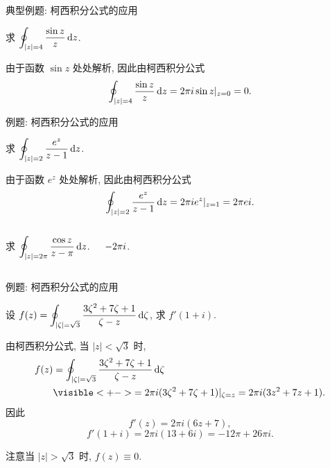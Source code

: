 \begin{frame}{典型例题: 柯西积分公式的应用}
\begin{example}
求 $\displaystyle\oint_{|z|=4}\frac{\sin z}z\,\mathrm{d} z$.
\end{example}
\begin{solution}
由于函数 $\sin z$ 处处解析,
\onslide<+->
因此由柯西积分公式
\[\oint_{|z|=4}\frac{\sin z}z\,\mathrm{d} z
=2\pi i \sin z|_{z=0}=0.\]
\end{solution}
\end{frame}


\begin{frame}[<*>]{例题: 柯西积分公式的应用}
\onslide<+->
\begin{example}
求 $\displaystyle\oint_{|z|=2}\frac{e^z}{z-1}\,\mathrm{d} z$.
\end{example}

\onslide<+->
\begin{solution}
由于函数 $e^z$ 处处解析,
\onslide<+->
因此由柯西积分公式
\[\oint_{|z|=2}\frac{e^z}{z-1}\,\mathrm{d} z
=2\pi i e^z|_{z=1}=2\pi ei.\]
\end{solution}

\onslide<+->
\begin{columns}
		\begin{exercise}
		求 $\displaystyle\oint_{|z|=2\pi}\frac{\cos z}{z-\pi}\,\mathrm{d} z$.
		\end{exercise}\onslide<+->
		\begin{answer}
		$-2\pi i\vphantom{\displaystyle\oint_{|z|=2\pi}\frac{\cos z}{z-\pi}\diff z}$.
		\end{answer}
\end{columns}
\end{frame}


\begin{frame}{例题: 柯西积分公式的应用}
\beqskip{5pt}
\begin{example}
设 $f(z)=\displaystyle\oint_{|\zeta|=\sqrt3}\frac{3\zeta^2+7\zeta+1}{\zeta-z}\,\mathrm{d} \zeta$, 求 $f'(1+i)$.
\end{example}
\begin{solution}
由柯西积分公式, 当 $|z|<\sqrt3$ 时,
\begin{align*}
f(z)&=\oint_{|\zeta|=\sqrt3}\frac{3\zeta^2+7\zeta+1}{\zeta-z}\diff \zeta\\
&\visible<+->{=2\pi i(3\zeta^2+7\zeta+1)|_{\zeta=z}=2\pi i(3z^2+7z+1).}
\end{align*}
\onslide<+->
因此
\vspace{-\baselineskip}
\[f'(z)=2\pi i(6z+7),\]
\vspace{-\baselineskip}
\onslide<+->
\[f'(1+i)=2\pi i(13+6i)=-12\pi+26\pi i.\]
\end{solution}
\onslide<+->
注意当 $|z|>\sqrt3$ 时, $f(z)\equiv0$.
\endgroup
\end{frame}


